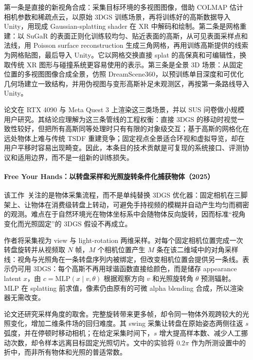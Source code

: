 第一条是直接的新视角合成：采集目标环境的多视图图像，借助 COLMAP 估计相机参数和稀疏点云，以原始 3DGS 训练场景，再将训练好的高斯数据导入 Unity，用现成 Gaussian-splatting shader 在 XR 中解码和绘制。第二条是网格重建：以 SuGaR 的表面正则化训练较均匀、贴近表面的高斯，从可见表面采样点和法线，用 Poisson surface reconstruction 生成三角网格，再用训练高斯提供的线索为网格贴图，最后导入 Unity。它以网格交换直接 splat 的高保真和可编辑性，换取传统 XR 图形与碰撞系统更容易使用的表示。第三条是全景 3D 场景：从固定位置的多视图图像合成全景，仿照 DreamScene360，以预训练单目深度和可优化几何场建立一致结构，并用伪视图与变形高斯补足未观测区，再按第一条路线导入 Unity。

论文在 RTX 4090 与 Meta Quest 3 上渲染这三类场景，并以 SUS 问卷做小规模用户研究。其结论应理解为这三条管线的工程权衡：直接 3DGS 的移动时视觉一致性较好，但把所有高斯同等处理时只有有限的对象级交互；基于高斯的网格化在远处物体上难与传统 TSDF 重建竞争；固定视点全景适合环视和虚拟导览，却在用户平移时容易出现畸变。因此，本条目的技术贡献是可复现的系统接口、评测协议和适用边界，而不是一组新的训练损失。

\paragraph{Free Your Hands：以转盘采样和光照旋转条件化捕获物体（2025）\cite{2503_05511}}
该工作~\cite{2503_05511}关注的是物体采集流程，而不是单纯替换 3DGS 优化器：固定相机在三脚架上、让物体在消费级转盘上转动，可避免手持视频的模糊并自动产生均匀而稠密的观测。难点在于自然环境光在物体坐标系中会随物体反向旋转，因而标准“视角变化而光照固定”的 3DGS 假设不再成立。

作者将采集视为 view 与 light-rotation 两维采样。对每个固定相机位置完成一次转盘旋转并从视频取 $N$ 帧，$M$ 个相机位置产生 $M$ 条在该二维域中的对角采样线：视角与光照角在一条转盘序列内被绑定，但改变相机位置会提供另一条线。表示仍可用 3DGS：每个高斯不再用球谐函数直接给颜色，而是储存 appearance latent $x$，由 $c=\mathrm{MLP}(x\mid v,\theta)$ 根据观察方向 $v$ 和光照旋转角 $\theta$ 预测辐射。MLP 在 splatting 前求值，像素仍由原有的可微 alpha blending 合成，所以渲染器无需改变。

论文还研究采样角度的取舍。完整旋转带来更多帧，却令同一物体外观跨较大的光照变化，增加二维条件场的回归难度。其 swing 采集让转盘在原始姿态两侧往返 $s$ 弧度，并在停顿时移动相机；在给定采集时间下，$s$ 增大提高样本数、减少人工挪动次数，却令样本远离目标固定光照切片。文中的实验将 $0.2\pi$ 作为所测设置中的折中，而非所有物体和光照的普适常数。

